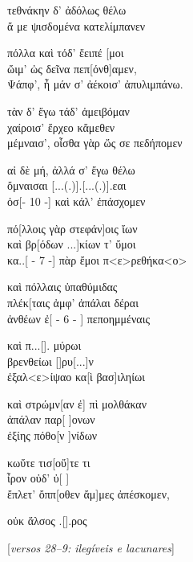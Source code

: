 \begin{gkverse}
τεθνάκην δ’ ἀδόλως θέλω\\
ἄ με ψισδομένα κατελίμπανεν

πόλλα καὶ τόδ’ ἔειπέ  [μοι\\
ὤιμ’ ὠς δεῖνα πεπ[όνθ]αμεν,\\
Ψάπφ’, ἦ μάν σ’ ἀέκοισ’ ἀπυλιμπάνω.

τὰν δ’ ἔγω τάδ’ ἀμειβόμαν\\
χαίροισ’ ἔρχεο κἄμεθεν\\
μέμναισ’, οἶσθα γὰρ ὤς σε πεδήπομεν

αἰ δὲ μή, ἀλλά σ’ ἔγω θέλω\\
ὄμναισαι [...(.)].[...(.)].εαι\\
ὀσ[\qquad     - 10 -\qquad   ] καὶ κάλ’ ἐπάσχομεν

πό[λλοις γὰρ στεφάν]οις ἴων\\
καὶ βρ[όδων ...]κίων τ’ ὔμοι\\
κα..[ - 7 -\quad   ] πὰρ ἔμοι π<ε>ρεθήκα<ο>

καὶ πόλλαις ὐπαθύμιδας\\
πλέκ[ταις ἀμφ’ ἀπάλαι δέραι\\
ἀνθέων ἐ[  -  6  -  ] πεποημμέναις

καὶ π...[\qquad      ]. μύρωι\\
βρενθείωι [\qquad      ]ρυ[...]ν\\
ἐξαλ<ε>ίψαο κα[ὶ βασ]ιληίωι

καὶ στρώμν[αν ἐ] πὶ μολθάκαν\\
ἀπάλαν παρ[ \quad   ]ονων\\ 
ἐξίης πόθο[ν \quad    ]νίδων

κωὔτε τισ[\quad       οὔ]τε τι\\
ἶρον οὐδ’ ὐ[ \quad        ]\\
ἔπλετ’ ὄππ[οθεν ἄμ]μες ἀπέσκομεν,

οὐκ ἄλσος .[\qquad	       ].ρος

\textnormal{[\textit{versos 28--9: ilegíveis e lacunares}]}
\end{gkverse}

\pagebreak

